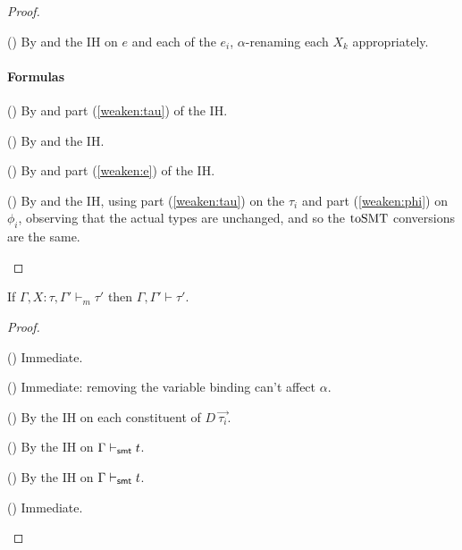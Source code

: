 \documentclass[acmsmall,screen,nonacm]{acmart}
\theoremstyle{definition}
\begin{document}
\begin{lemma}[Weakening]
\begin{proof}
\begin{proofcases}
  \item[(\rn{$e$-Match})] By  and the IH on $e$ and each
  of the $e_i$, $\alpha$-renaming each $X_k$ appropriately.

\end{proofcases}

\paragraph*{Formulas}

\begin{proofcases}
  \item[(\rn{$\phi$-Var})] By  and part
  (\ref{weaken:tau}) of the IH.

  \item[(\rn{$\phi$-Promote})] By  and the IH.

  \item[(\rn{$\phi$-Unquote})] By  and part
  (\ref{weaken:e}) of the IH.

  \item[(\rn{$\phi$-Ctor})] By  and the IH, using part
    (\ref{weaken:tau}) on the $\tau_i$ and part (\ref{weaken:phi}) on
    $\phi_i$, observing that the actual types are unchanged, and so
    the $\mathrm{toSMT}$ conversions are the same.
%
  \qedhere

\end{proofcases}

\end{proof}
\end{lemma}

\begin{lemma}
\label{lem:types-strengthen}
  If $\Gamma,X:\tau,\Gamma' \vdash_m \tau'$ then $\Gamma,\Gamma' \vdash \tau'$.
%
\begin{proof}

\begin{proofcases}

  \item[(\rn{$t$-Base})] Immediate.

  \item[(\rn{$t$-TVar})] Immediate: removing the variable binding can't affect $\alpha$.

  \item[(\rn{$t$-ADT})] By the IH on each constituent of $D ~ \vec{\tau_i}$.

  \item[(\rn{$\tau$-SMT})] By the IH on $\Gamma \vdash_{\mathsf{smt}} t$.

  \item[(\rn{$\tau$-Sym})] By the IH on $\Gamma \vdash_{\mathsf{smt}} t$.

  \item[(\rn{$\tau$-Model})] Immediate.
%
  \qedhere

\end{proofcases}
\end{proof}
\end{lemma}
\end{document}
